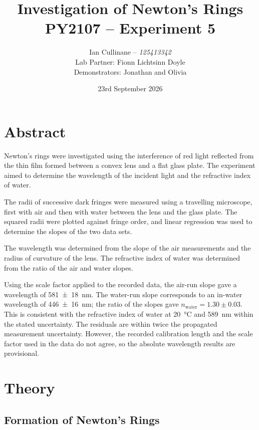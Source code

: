 \documentclass[12pt,a4paper]{article}
\title{
    \Large\textbf{Investigation of Newton's Rings}\\[0.5em]
    \large PY2107 -- Experiment 5
}
\author{
    Ian Cullinane -- \textit{125413342}\\[0.5em]
    Lab Partner: Fionn Lichtsinn Doyle\\[0.5em]
    Demonstrators: Jonathan and Olivia
}
\date{23rd September 2026}
\begin{document}
\maketitle
\thispagestyle{empty}

\newpage
\tableofcontents
\newpage

\section{Abstract}

Newton's rings were investigated using the interference
of red light reflected from the thin film formed between
a convex lens and a flat glass plate. The experiment
aimed to determine the wavelength of the incident light
and the refractive index of water.

The radii of successive dark fringes were measured
using a travelling microscope, first with air and then
with water between the lens and the glass plate. The
squared radii were plotted against fringe order,
and linear regression was used to determine the slopes
of the two data sets.

The wavelength was determined from the slope of the
air measurements and the radius of curvature of the
lens. The refractive index of water was determined
from the ratio of the air and water slopes.

Using the scale factor applied to the recorded data, the
air-run slope gave a wavelength of
\SI{581\pm18}{nm}. The water-run slope corresponds to an
in-water wavelength of \SI{446\pm16}{nm}; the ratio of
the slopes gave $n_{\mathrm{water}}=1.30\pm0.03$. This is
consistent with the refractive index of water at
\SI{20}{\degreeCelsius} and \SI{589}{nm} within the stated
uncertainty. The residuals are within twice the propagated
measurement uncertainty. However, the recorded calibration
length and the scale factor used in the data do not agree,
so the absolute wavelength results are provisional.

\newpage

\section{Theory}

\subsection{Formation of Newton's Rings}
\end{document}

